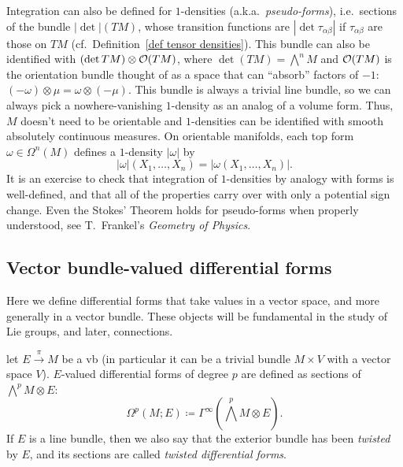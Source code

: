 \begin{rem}
    Integration can also be defined for $1$-densities (a.k.a.~\emph{pseudo-forms}), i.e.\ sections of the bundle $|\det|(TM)$, whose transition functions are $|\det\tau_{\alpha\beta}|$ if $\tau_{\alpha\beta}$ are those on $TM$ (cf.\ Definition~\ref{def tensor densities}). This bundle can also be identified with $(\det TM)\otimes \mathcal{O}(TM)$, where $\det (TM)=\bigwedge^n M$ and $\mathcal{O}(TM)$ is the orientation bundle thought of as a space that can ``absorb'' factors of $- 1$: $(-\omega)\otimes \mu=\omega\otimes (-\mu)$. This bundle is always a trivial line bundle, so we can always pick a nowhere-vanishing $1$-density as an analog of a volume form. Thus, $M$ doesn't need to be orientable and $1$-densities can be identified with smooth absolutely continuous measures. On orientable manifolds, each top form $\omega\in\Omega^n(M)$ defines a $1$-density $|\omega|$ by 
    \[|\omega|(X_1,\ldots,X_n)=|\omega(X_1,\ldots,X_n)|.\]
    It is an exercise to check that integration of $1$-densities by analogy with forms is well-defined, and that all of the properties carry over with only a potential sign change. Even the Stokes' Theorem holds for pseudo-forms when properly understood, see T.~Frankel's \emph{Geometry of Physics}.
\end{rem}







\subsection{Vector bundle-valued differential forms}

Here we define differential forms that take values in a vector space, and more generally in a vector bundle. These objects will be fundamental in the study of Lie groups, and later, connections.

\begin{defn}
    let $E\overset\pi\to M$ be a \gls{vb} (in particular it can be a trivial bundle $M\times V$ with a vector space $V$). $E$-valued differential forms of degree $p$ are defined as sections of $\bigwedge^pM\otimes E$:
    \[\Omega^p(M;E)\coloneqq \Gamma^\infty\left(\bigwedge^pM\otimes E\right).\]
     If $E$ is a line bundle, then we also say that the exterior bundle has been \emph{twisted} by $E$, and its sections are called \emph{twisted differential forms}.
\end{defn}


